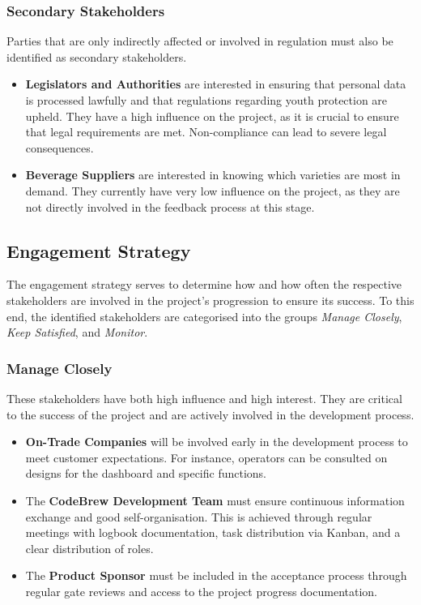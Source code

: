 \documentclass[a4paper,12pt]{article}
\begin{document}
\subsubsection{Secondary Stakeholders}
Parties that are only indirectly affected or involved in regulation must also be identified as secondary stakeholders.

\begin{itemize}
	\item \textbf{Legislators and Authorities} are interested in ensuring that personal data is processed lawfully and that regulations regarding youth protection are upheld.
	      They have a high influence on the project, as it is crucial to ensure that legal requirements are met. Non-compliance can lead to severe legal consequences.
	\item \textbf{Beverage Suppliers} are interested in knowing which varieties are most in demand.
	      They currently have very low influence on the project, as they are not directly involved in the feedback process at this stage.
\end{itemize}

\subsection{Engagement Strategy}
The engagement strategy serves to determine how and how often the respective stakeholders are involved in the project's progression to ensure its success.
To this end, the identified stakeholders are categorised into the groups \textit{Manage Closely}, \textit{Keep Satisfied}, and \textit{Monitor}.

\subsubsection{Manage Closely}
These stakeholders have both high influence and high interest. They are critical to the success of the project and are actively involved in the development process.

\begin{itemize}
	\item \textbf{On-Trade Companies} will be involved early in the development process to meet customer expectations.
	      For instance, operators can be consulted on designs for the dashboard and specific functions.
	\item The \textbf{CodeBrew Development Team} must ensure continuous information exchange and good self-organisation.
	      This is achieved through regular meetings with logbook documentation, task distribution via Kanban, and a clear distribution of roles.
	\item The \textbf{Product Sponsor} must be included in the acceptance process through regular gate reviews and access to the project progress documentation.
\end{itemize}
\end{document}
